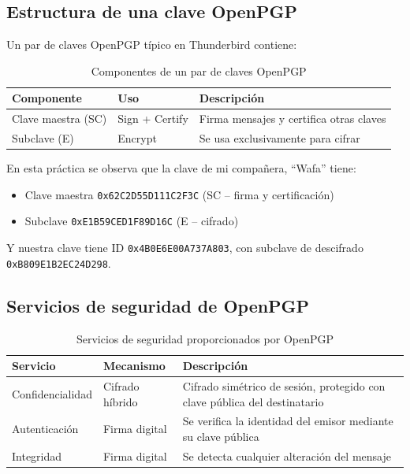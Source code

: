 \subsection{Estructura de una clave OpenPGP}

Un par de claves OpenPGP típico en Thunderbird contiene:

\begin{table}[H]
    \centering
    \caption{Componentes de un par de claves OpenPGP}
    \begin{tabularx}{\textwidth}{l|l|X}
        \toprule
        \textbf{Componente} & \textbf{Uso} & \textbf{Descripción} \\
        \midrule
        Clave maestra (SC) & Sign + Certify & Firma mensajes y certifica otras claves \\
        Subclave (E) & Encrypt & Se usa exclusivamente para cifrar \\
        \bottomrule
    \end{tabularx}
\end{table}

En esta práctica se observa que la clave de mi compañera, ``Wafa'' tiene:
\begin{itemize}[label=\textbullet]
    \item Clave maestra \texttt{0x62C2D55D111C2F3C} (SC -- firma y certificación)
    \item Subclave \texttt{0xE1B59CED1F89D16C} (E -- cifrado)
\end{itemize}
Y nuestra clave tiene ID \texttt{0x4B0E6E00A737A803}, con subclave de descifrado \texttt{0xB809E1B2EC24D298}.

\subsection{Servicios de seguridad de OpenPGP}

\begin{table}[H]
    \centering
    \caption{Servicios de seguridad proporcionados por OpenPGP}
    \begin{tabularx}{\textwidth}{l|l|X}
        \toprule
        \textbf{Servicio} & \textbf{Mecanismo} & \textbf{Descripción} \\
        \midrule
        Confidencialidad & Cifrado híbrido & Cifrado simétrico de sesión, protegido con clave pública del destinatario \\
        Autenticación & Firma digital & Se verifica la identidad del emisor mediante su clave pública \\
        Integridad & Firma digital & Se detecta cualquier alteración del mensaje \\
        \bottomrule
    \end{tabularx}
\end{table}

